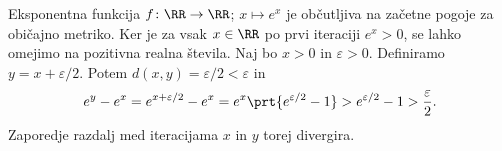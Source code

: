 \begin{primer}
    Eksponentna funkcija \(f \colon \RR \to \RR\); \(x \mapsto e^x\) je občutljiva na začetne pogoje za običajno metriko. Ker je za vsak \(x \in \RR\) po prvi iteraciji \(e^x > 0\), se lahko omejimo na pozitivna realna števila. Naj bo \(x > 0\) in \(\varepsilon > 0\). Definiramo \(y = x + \varepsilon / 2\). Potem \(d (x, y) = \varepsilon / 2 < \varepsilon\) in
    \[e^{y} - e^{x} = e^{x + \varepsilon / 2} - e^x = e^x \prt{e^{\varepsilon / 2} - 1} > e^{\varepsilon / 2} - 1 > \frac{\varepsilon}{2}.\]
    Zaporedje razdalj med iteracijama \(x\) in \(y\) torej divergira.
\end{primer}





